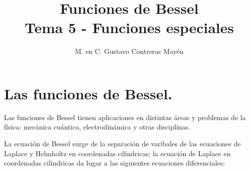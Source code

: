 
\usepackage{apacite}
\title{Funciones de Bessel \\ \large {Tema 5 - Funciones especiales} \vspace{-3ex}}
\author{M. en C. Gustavo Contreras Mayén}
\date{ }

\vspace{-4cm}
\maketitle
\fontsize{14}{14}\selectfont
\tableofcontents
\newpage
\section{Las funciones de Bessel.}

Las funciones de Bessel tienen aplicaciones en distintas áreas y problemas de la física: mecánica cuántica, electrodinámica y otras disciplinas.
\par
La ecuación de Bessel surge de la separación de varibales de las ecuaciones de Laplace y Helmholtz en coordenadas cilíndricas; la ecuación de Laplace en coordenadas cilíndricas da lugar a las siguientes ecuaciones diferenciales:

